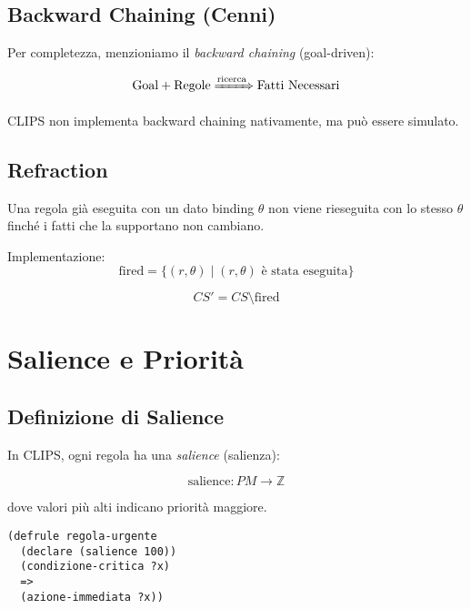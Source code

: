 \subsection{Backward Chaining (Cenni)}

Per completezza, menzioniamo il \textit{backward chaining} (goal-driven):

\begin{equation}
\text{Goal} + \text{Regole} \xRightarrow{\text{ricerca}} \text{Fatti Necessari}
\end{equation}

CLIPS non implementa backward chaining nativamente, ma può essere simulato.

\subsection{Refraction}

\begin{definizione}[Refraction]
Una regola già eseguita con un dato binding $\theta$ non viene rieseguita con lo stesso $\theta$ finché i fatti che la supportano non cambiano.
\end{definizione}

Implementazione:
\begin{equation}
\text{fired} = \{(r, \theta) \mid (r, \theta) \text{ è stata eseguita}\}
\end{equation}

\begin{equation}
CS' = CS \setminus \text{fired}
\end{equation}

\section{Salience e Priorità}

\subsection{Definizione di Salience}

In CLIPS, ogni regola ha una \textit{salience} (salienza):

\begin{equation}
\text{salience}: PM \to \mathbb{Z}
\end{equation}

dove valori più alti indicano priorità maggiore.

\begin{esempio}
\begin{lstlisting}[language=CLIPS]
(defrule regola-urgente
  (declare (salience 100))
  (condizione-critica ?x)
  =>
  (azione-immediata ?x))
\end{lstlisting}
\end{esempio}

